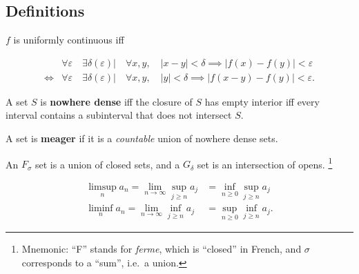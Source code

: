 \hypertarget{definitions}{%
\subsection{Definitions}\label{definitions}}

\begin{definition}

\(f\) is uniformly continuous iff

\begin{align*}
    &\forall \varepsilon \quad \exists \delta(\varepsilon) \mathrel{\Big|}\quad \forall x, y, \quad {\left\lvert {x - y} \right\rvert} < \delta \implies {\left\lvert {f(x) - f(y)} \right\rvert} < \varepsilon \\
\iff &\forall \varepsilon \quad \exists \delta(\varepsilon) \mathrel{\Big|}\quad \forall x, y, \quad {\left\lvert {y} \right\rvert} < \delta \implies {\left\lvert {f(x-y) - f(y)} \right\rvert} < \varepsilon
.\end{align*}

\end{definition}

\begin{definition}

A set \(S\) is \textbf{nowhere dense} iff the closure of \(S\) has empty
interior iff every interval contains a subinterval that does not
intersect \(S\).

\end{definition}

\begin{definition}

A set is \textbf{meager} if it is a \emph{countable} union of nowhere
dense sets.

\end{definition}

\begin{definition}

An \(F_\sigma\) set is a union of closed sets, and a \(G_\delta\) set is
an intersection of opens. \footnote{Mnemonic: ``F'' stands for
  \emph{ferme}, which is ``closed'' in French, and \(\sigma\)
  corresponds to a ``sum'', i.e.~a union.}

\end{definition}

\begin{definition}

\begin{align*}  
\limsup_n a_n = \lim_{n\to \infty} \sup_{j\geq n} a_j &= \inf_{n\geq 0} \sup_{j\geq n} a_j \\ 
\liminf_n a_n = \lim_{n\to \infty} \inf_{j\geq n} a_j &= \sup_{n\geq 0} \inf_{j\geq n} a_j
.\end{align*}

\end{definition}

